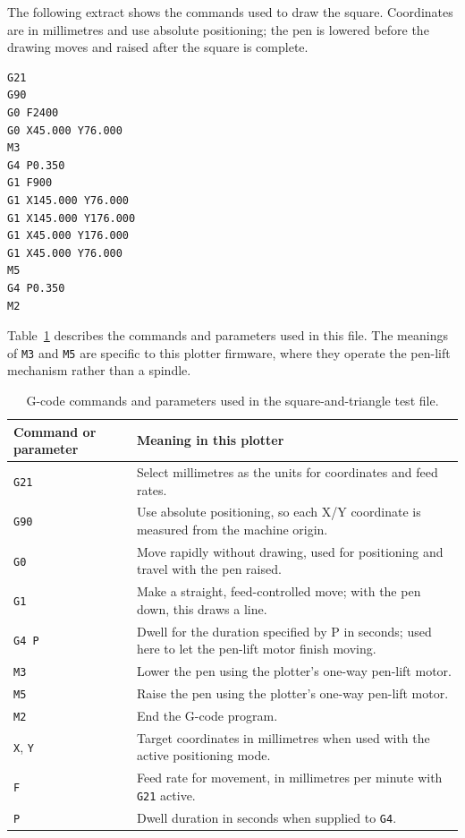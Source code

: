 The following extract shows the commands used to draw the square. Coordinates are in millimetres and use absolute positioning; the pen is lowered before the drawing moves and raised after the square is complete.

\begin{verbatim}
G21
G90
G0 F2400
G0 X45.000 Y76.000
M3
G4 P0.350
G1 F900
G1 X145.000 Y76.000
G1 X145.000 Y176.000
G1 X45.000 Y176.000
G1 X45.000 Y76.000
M5
G4 P0.350
M2
\end{verbatim}

Table~\ref{tab:gcode-command-meanings} describes the commands and parameters used in this file. The meanings of \texttt{M3} and \texttt{M5} are specific to this plotter firmware, where they operate the pen-lift mechanism rather than a spindle.

\begin{table}[!htbp]
    \centering
    \begin{tabularx}{\linewidth}{|l|X|}
        \hline
        \textbf{Command or parameter} & \textbf{Meaning in this plotter} \\
        \hline
        \texttt{G21} & Select millimetres as the units for coordinates and feed rates. \\
        \hline
        \texttt{G90} & Use absolute positioning, so each X/Y coordinate is measured from the machine origin. \\
        \hline
        \texttt{G0} & Move rapidly without drawing, used for positioning and travel with the pen raised. \\
        \hline
        \texttt{G1} & Make a straight, feed-controlled move; with the pen down, this draws a line. \\
        \hline
        \texttt{G4 P} & Dwell for the duration specified by P in seconds; used here to let the pen-lift motor finish moving. \\
        \hline
        \texttt{M3} & Lower the pen using the plotter's one-way pen-lift motor. \\
        \hline
        \texttt{M5} & Raise the pen using the plotter's one-way pen-lift motor. \\
        \hline
        \texttt{M2} & End the G-code program. \\
        \hline
        \texttt{X}, \texttt{Y} & Target coordinates in millimetres when used with the active positioning mode. \\
        \hline
        \texttt{F} & Feed rate for movement, in millimetres per minute with \texttt{G21} active. \\
        \hline
        \texttt{P} & Dwell duration in seconds when supplied to \texttt{G4}. \\
        \hline
    \end{tabularx}
    \caption{G-code commands and parameters used in the square-and-triangle test file.}
    \label{tab:gcode-command-meanings}
\end{table}


